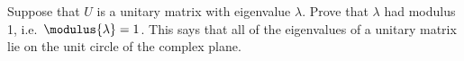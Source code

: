 Suppose that $U$ is a unitary matrix with eigenvalue $\lambda$.  Prove that $\lambda$ had modulus 1, i.e.\ $\modulus{\lambda}=1$.  This says that all of the eigenvalues of a unitary matrix lie on the unit circle of the complex plane.
